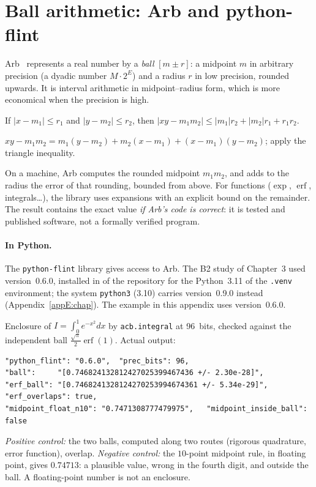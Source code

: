 \section{Ball arithmetic: Arb and python-flint}\label{appD:sec:boules}

Arb~\cite{ch3-arb} represents a real number by a \emph{ball} $[m\pm r]$: a midpoint $m$ in arbitrary precision (a
dyadic number $M\cdot2^E$) and a radius $r$ in low precision, rounded upwards. It is interval arithmetic in
midpoint--radius form, which is more economical when the precision is high.

\begin{proposition}\label{appD:prop:produit}
If $|x-m_1|\le r_1$ and $|y-m_2|\le r_2$, then $|xy-m_1m_2|\le|m_1|r_2+|m_2|r_1+r_1r_2$.
\end{proposition}

\begin{humanproof}
$xy-m_1m_2=m_1(y-m_2)+m_2(x-m_1)+(x-m_1)(y-m_2)$; apply the triangle inequality.
\end{humanproof}
On a machine, Arb computes the rounded midpoint $m_1m_2$, and adds to the radius the error of that rounding, bounded
from above. For functions ($\exp$, $\operatorname{erf}$, integrals\ldots), the library uses expansions with an explicit
bound on the remainder. The result contains the exact value \emph{if Arb's code is correct}: it is tested and
published software, not a formally verified program.

\paragraph{In Python.} The \texttt{python-flint} library gives access to Arb. The B2 study of Chapter~3 used
version~0.6.0, installed in  of the repository for the Python~3.11 of the \texttt{.venv}
environment; the system \texttt{python3} (3.10) carries version~0.9.0 instead (Appendix~\ref{appE:chap}). The example
in this appendix uses version~0.6.0.

\begin{numbox}
Enclosure of $I=\int_0^1e^{-x^2}dx$ by \texttt{acb.integral} at 96~bits, checked against the independent ball
$\frac{\sqrt\pi}2\operatorname{erf}(1)$. Actual output:
\begin{lstlisting}[style=appC,language={}]
"python_flint": "0.6.0",  "prec_bits": 96,
"ball":     "[0.746824132812427025399467436 +/- 2.30e-28]",
"erf_ball": "[0.7468241328124270253994674361 +/- 5.34e-29]",   "erf_overlaps": true,
"midpoint_float_n10": "0.7471308777479975",   "midpoint_inside_ball": false
\end{lstlisting}
\emph{Positive control:} the two balls, computed along two routes (rigorous quadrature, error function), overlap.
\emph{Negative control:} the $10$-point midpoint rule, in floating point, gives $0.74713$: a plausible value, wrong in
the fourth digit, and outside the ball. A floating-point number is not an enclosure.
\end{numbox}

